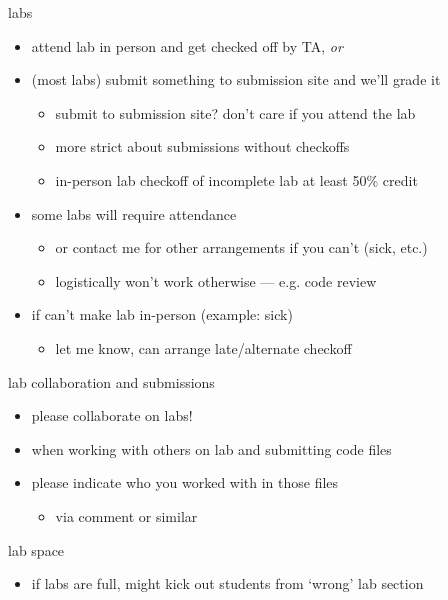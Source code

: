 \begin{frame}{labs}
    \begin{itemize}
    \item attend lab in person and get checked off by TA, \textit{or}
    \item (most labs) submit something to submission site and we'll grade it
        \begin{itemize}
        \item submit to submission site? don't care if you attend the lab
        \item more strict about submissions without checkoffs
        \item in-person lab checkoff of incomplete lab at least 50\% credit
        \end{itemize}
    \item some labs will require attendance
        \begin{itemize}
        \item or contact me for other arrangements if you can't (sick, etc.)
        \item logistically won't work otherwise --- e.g. code review
        \end{itemize}
    \item if can't make lab in-person (example: sick)
        \begin{itemize}
        \item let me know, can arrange late/alternate checkoff
        \end{itemize}
    \end{itemize}
\end{frame}

\begin{frame}{lab collaboration and submissions}
    \begin{itemize}
    \item please collaborate on labs!
    \vspace{.5cm}
    \item when working with others on lab and submitting code files
    \item please indicate who you worked with in those files
        \begin{itemize}
        \item via comment or similar
        \end{itemize}
    \end{itemize}
\end{frame}

\begin{frame}{lab space}
    \begin{itemize}
    \item if labs are full, might kick out students from `wrong' lab section
    \end{itemize}
\end{frame}
